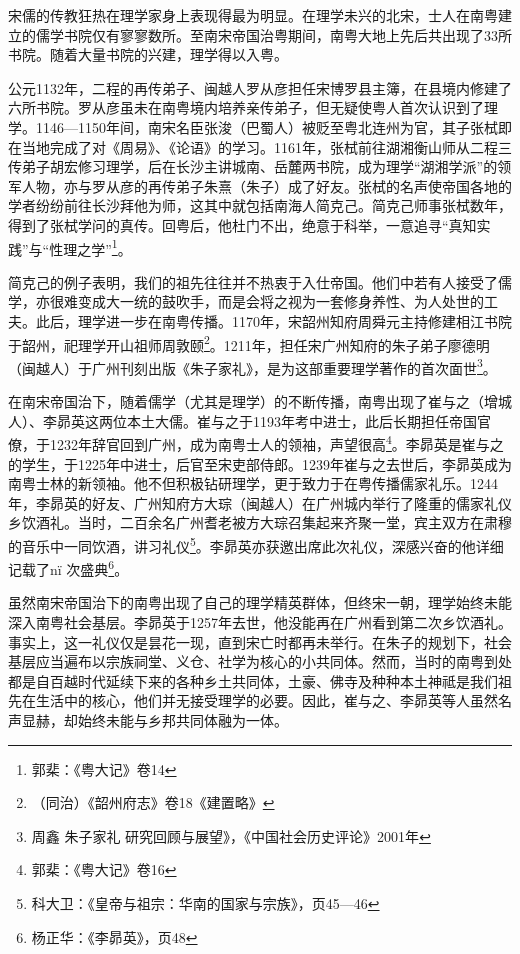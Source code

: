 \indent 宋儒的传教狂热在理学家身上表现得最为明显。在理学未兴的北宋，士人在南粤建立的儒学书院仅有寥寥数所。至南宋帝国治粤期间，南粤大地上先后共出现了33所书院。随着大量书院的兴建，理学得以入粤。

公元1132年，二程的再传弟子、闽越人罗从彦担任宋博罗县主簿，在县境内修建了六所书院。罗从彦虽未在南粤境内培养亲传弟子，但无疑使粤人首次认识到了理学。1146—1150年间，南宋名臣张浚（巴蜀人）被贬至粤北连州为官，其子张栻即在当地完成了对《周易》、《论语》的学习。1161年，张栻前往湖湘衡山师从二程三传弟子胡宏修习理学，后在长沙主讲城南、岳麓两书院，成为理学“湖湘学派”的领军人物，亦与罗从彦的再传弟子朱熹（朱子）成了好友。张栻的名声使帝国各地的学者纷纷前往长沙拜他为师，这其中就包括南海人简克己。简克己师事张栻数年，得到了张栻学问的真传。回粤后，他杜门不出，绝意于科举，一意追寻“真知实践”与“性理之学”\footnote{郭棐：《粤大记》卷14}。

简克己的例子表明，我们的祖先往往并不热衷于入仕帝国。他们中若有人接受了儒学，亦很难变成大一统的鼓吹手，而是会将之视为一套修身养性、为人处世的工夫。此后，理学进一步在南粤传播。1170年，宋韶州知府周舜元主持修建相江书院于韶州，祀理学开山祖师周敦颐\footnote{（同治）《韶州府志》卷18《建置略》}。1211年，担任宋广州知府的朱子弟子廖德明（闽越人）于广州刊刻出版《朱子家礼》，是为这部重要理学著作的首次面世\footnote{周鑫 朱子家礼 研究回顾与展望》，《中国社会历史评论》2001年}。

在南宋帝国治下，随着儒学（尤其是理学）的不断传播，南粤出现了崔与之（增城人）、李昴英这两位本土大儒。崔与之于1193年考中进士，此后长期担任帝国官僚，于1232年辞官回到广州，成为南粤士人的领袖，声望很高\footnote{郭棐：《粤大记》卷16}。李昴英是崔与之的学生，于1225年中进士，后官至宋吏部侍郎。1239年崔与之去世后，李昴英成为南粤士林的新领袖。他不但积极钻研理学，更于致力于在粤传播儒家礼乐。1244年，李昴英的好友、广州知府方大琮（闽越人）在广州城内举行了隆重的儒家礼仪乡饮酒礼。当时，二百余名广州耆老被方大琮召集起来齐聚一堂，宾主双方在肃穆的音乐中一同饮酒，讲习礼仪\footnote{科大卫：《皇帝与祖宗：华南的国家与宗族》，页45—46}。李昴英亦获邀出席此次礼仪，深感兴奋的他详细记载了nï 次盛典\footnote{杨正华：《李昴英》，页48}。

虽然南宋帝国治下的南粤出现了自己的理学精英群体，但终宋一朝，理学始终未能深入南粤社会基层。李昴英于1257年去世，他没能再在广州看到第二次乡饮酒礼。事实上，这一礼仪仅是昙花一现，直到宋亡时都再未举行。在朱子的规划下，社会基层应当遍布以宗族祠堂、义仓、社学为核心的小共同体。然而，当时的南粤到处都是自百越时代延续下来的各种乡土共同体，土豪、佛寺及种种本土神祗是我们祖先在生活中的核心，他们并无接受理学的必要。因此，崔与之、李昴英等人虽然名声显赫，却始终未能与乡邦共同体融为一体。

